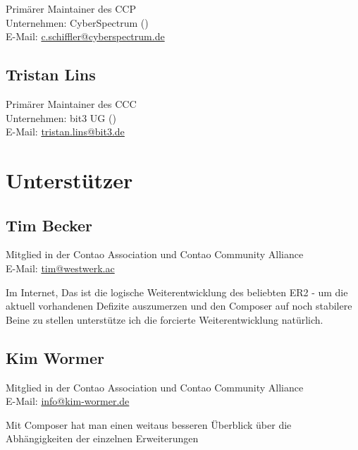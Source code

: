 \documentclass[
paper=a4,
draft=false,%
fontsize=10pt%
]{scrartcl}
\begin{document}
Primärer Maintainer des CCP \\
Unternehmen: CyberSpectrum () \\
E-Mail: \href{mailto:c.schiffler@cyberspectrum.de}{c.schiffler@cyberspectrum.de}

\subsection*{Tristan  Lins}

Primärer Maintainer des CCC \\
Unternehmen: bit3 UG () \\
E-Mail: \href{mailto:tristan.lins@bit3.de}{tristan.lins@bit3.de}

%
%

\newpage

\section{Unterstützer}
\label{sec:backers}

\subsection*{Tim  Becker}

Mitglied in der Contao Association und Contao Community Alliance \\
E-Mail: \href{mailto:tim@westwerk.ac}{tim@westwerk.ac}

Im Internet, Das  ist die logische Weiterentwicklung des beliebten ER2 - um die aktuell vorhandenen Defizite auszumerzen und den Composer auf noch stabilere Beine zu stellen unterstütze ich die forcierte Weiterentwicklung natürlich.

\subsection*{Kim  Wormer}

Mitglied in der Contao Association und Contao Community Alliance \\
E-Mail: \href{mailto:info@kim-wormer.de}{info@kim-wormer.de}

Mit Composer hat man einen weitaus besseren Überblick über die Abhängigkeiten der einzelnen Erweiterungen
\end{document}
